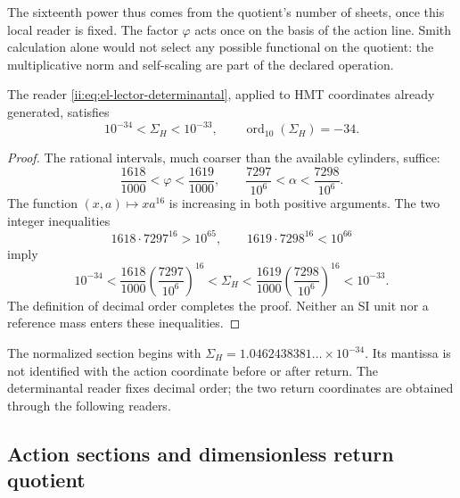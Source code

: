 The sixteenth power thus comes from the quotient's number of sheets, once this local reader is fixed. The factor \(\varphi\) acts once on the basis of the action line. Smith calculation alone would not select any possible functional on the quotient: the multiplicative norm and self-scaling are part of the declared operation.

\begin{theorem}
The reader \eqref{ii:eq:el-lector-determinantal}, applied to HMT coordinates already generated, satisfies
\begin{equation}
 10^{-34}<\Sigma_H<10^{-33},\qquad
 \operatorname{ord}_{10}(\Sigma_H)=-34.
 \label{ii:eq:el-decada}
\end{equation}
\end{theorem}
\begin{proof}
The rational intervals, much coarser than the available cylinders, suffice:
\[
 \frac{1618}{1000}<\varphi<\frac{1619}{1000},\qquad
 \frac{7297}{10^6}<\alpha<\frac{7298}{10^6}.
\]
The function \((x,a)\mapsto xa^{16}\) is increasing in both positive
arguments. The two integer inequalities
\[
 1618\cdot7297^{16}>10^{65},\qquad
 1619\cdot7298^{16}<10^{66}
\]
imply
\[
 10^{-34}
 <\frac{1618}{1000}\left(\frac{7297}{10^6}\right)^{16}
 <\Sigma_H
 <\frac{1619}{1000}\left(\frac{7298}{10^6}\right)^{16}
 <10^{-33}.
\]
The definition of decimal order completes the proof. Neither an SI unit nor a reference mass enters these inequalities.
\end{proof}

The normalized section begins with \(\Sigma_H=1.0462438381\ldots\times10^{-34}\). Its mantissa is not identified with the action coordinate before or after return. The determinantal reader fixes decimal order; the two return coordinates are obtained through the following readers.


\subsection{Action sections and dimensionless return quotient}

